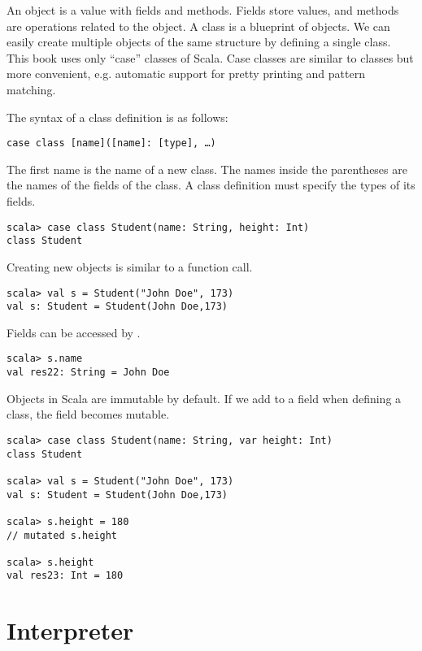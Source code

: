 An object is a value with fields and methods. Fields store values, and methods
are operations related to the object. A class is a blueprint of objects. We can
easily create multiple objects of the same structure by defining a single class.
This book uses only ``case'' classes of Scala. Case classes are similar to
classes but more convenient, e.g. automatic support for pretty printing and
pattern matching.

The syntax of a class definition is as follows:

\begin{verbatim}
case class [name]([name]: [type], …)
\end{verbatim}

The first name is the name of a new class. The names inside
the parentheses are the names of the fields of the class. A class definition
must specify the types of its fields.

\begin{verbatim}
scala> case class Student(name: String, height: Int)
class Student
\end{verbatim}

Creating new objects is similar to a function call.

\begin{verbatim}
scala> val s = Student("John Doe", 173)
val s: Student = Student(John Doe,173)
\end{verbatim}

Fields can be accessed by .

\begin{verbatim}
scala> s.name
val res22: String = John Doe
\end{verbatim}

Objects in Scala are immutable by default. If we add  to a field when
defining a class, the field becomes mutable.

\begin{verbatim}
scala> case class Student(name: String, var height: Int)
class Student

scala> val s = Student("John Doe", 173)
val s: Student = Student(John Doe,173)

scala> s.height = 180
// mutated s.height

scala> s.height
val res23: Int = 180
\end{verbatim}

\section{Interpreter}

